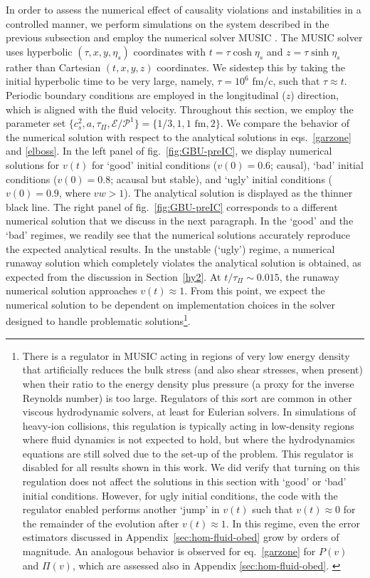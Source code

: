 \documentclass[aps, prd, showkeys,superscriptaddress, nofootinbib,floatfix]{revtex4-2}
\begin{document}
In order to assess the numerical effect of causality violations and instabilities in a controlled manner, we perform simulations on the system described in the previous subsection and employ the numerical solver MUSIC \cite{Schenke:2010nt,Schenke:2010rr,Paquet:2015lta}. The MUSIC solver uses hyperbolic $(\tau,x,y,\eta_s)$ coordinates with $t=\tau \cosh \eta_s$ and $z=\tau \sinh \eta_s$ rather than Cartesian $(t,x,y,z)$ coordinates. We sidestep this  by taking the initial hyperbolic time to be very large, namely, $\tau = 10^{6}$ fm/c, such that $\tau \approx t$. Periodic boundary conditions are employed in the longitudinal ($z$) direction, which is aligned with the fluid velocity. Throughout this section, we employ the parameter set $\{c_s^2,a,\tau_\Pi,\mathcal{E}/\mathcal{P}^1 \}=\{1/3,1,1 \text{ fm},2 \}$. We compare the behavior of the numerical solution with respect to the analytical solutions in eqs.~\eqref{garzone} and \eqref{elboss}.  In the left panel of fig.~\ref{fig:GBU-preIC}, we display numerical solutions for $v(t)$ for `good' initial conditions ($v(0) = 0.6$; causal), `bad' initial conditions ($v(0) = 0.8$; acausal but stable), and `ugly' initial conditions ($v(0) = 0.9$, where $vw > 1$). The analytical solution is displayed as the thinner black line.
	The right panel of fig.~\ref{fig:GBU-preIC} corresponds to a different numerical solution that we discuss in the next paragraph.
	In the `good' and the `bad' regimes, we readily see
	that the numerical solutions accurately reproduce the expected analytical results. In the unstable (`ugly') regime, a numerical runaway solution which completely violates the analytical solution is obtained, as expected from the discussion in Section~\ref{hy2}. At $t/\tau_{\Pi} \sim 0.015$, the runaway numerical solution approaches $v(t) \approx 1$. From this point, we expect the numerical solution to be dependent on implementation choices in the solver designed to handle problematic solutions\footnote{
	There is a regulator in MUSIC acting in regions of very low energy density that  artificially reduces the bulk stress (and also shear stresses, when present) when their ratio to the energy density plus pressure (a proxy for the inverse Reynolds number) is too large.
	Regulators of this sort are common in other viscous hydrodynamic solvers, at least for Eulerian solvers.
	In simulations of heavy-ion collisions, this regulation is typically acting in low-density regions where fluid dynamics is not expected to hold, but where the hydrodynamics equations are still solved due to the set-up of the problem. This regulator is disabled for all results shown in this work.
	We did verify that turning on this regulation does not affect the solutions in this section with `good' or `bad' initial conditions. However, for ugly initial conditions, the code with the regulator enabled performs another `jump' in $v(t)$ such that $v(t) \approx 0$ for the remainder of the evolution after $v(t) \approx 1$. In this regime, even the error estimators discussed in Appendix~\ref{sec:hom-fluid-obed} grow by orders of magnitude. An analogous behavior is observed for eq.~\eqref{garzone} for $P(v)$ and $\Pi(v)$, which are assessed also in Appendix \ref{sec:hom-fluid-obed}.
	\label{fn:QRV-MUSIC}
    }.
\end{document}
